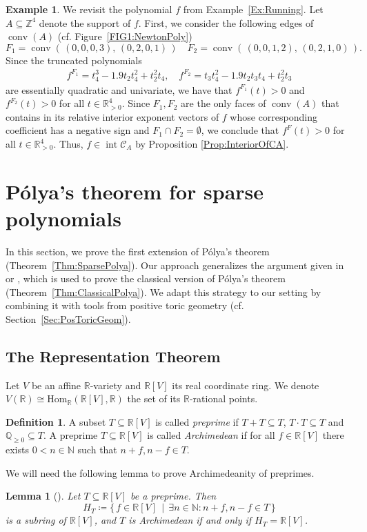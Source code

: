 \documentclass[a4paper,11pt]{amsart}
\newtheorem{lemma}[theorem]{Lemma}
\theoremstyle{definition}
\newtheorem{definition}[theorem]{Definition}
\newtheorem{example}[theorem]{Example}
\DeclareMathOperator{\interior}{int}
\DeclareMathOperator{\conv}{conv}
\newcommand{\NN}{\mathbb{N}}
\newcommand{\QQ}{\mathbb{Q}}
\newcommand{\RR}{\mathbb{R}}
\begin{document}
\begin{example}
\label{Ex:Running:Interior}
    We revisit the polynomial $f$ from Example~\ref{Ex:Running}. Let $A \subseteq \mathbb{Z}^4$ denote the support of $f$. First, we consider the following edges of $\conv(A)$ (cf. Figure~\ref{FIG1:NewtonPoly})
    \[F_1 =\conv(\, (0,0,0,3), \, (0,2,0,1) \,) \quad F_2 =\conv(\, (0,0,1,2), \, (0,2,1,0) \,).  \]
    Since the truncated polynomials 
      \begin{align*}
         f^{F_1} = t_4^3-1.9t_2t_4^2+ t_2^2t_4, \quad f^{F_2} = t_3t_4^2 -1.9t_2t_3t_4 + t_2^2 t_3
    \end{align*}
    are essentially quadratic and univariate, we have that  $f^{F_1}(t) > 0$ and $f^{F_2}(t) > 0$ for all $t \in \mathbb{R}^4_{>0}$. Since $F_1, F_2$ are the only faces of $\conv(A)$ that contains in its relative interior exponent vectors of $f$ whose corresponding coefficient has a negative sign and $F_1 \cap F_2 = \emptyset$, we conclude that $f^{F}(t) > 0$ for all $t \in \mathbb{R}^4_{>0}$.
    Thus, $f \in \interior \mathcal{C}_{A}$ by Proposition \ref{Prop:InteriorOfCA}.
\end{example}



\section{Pólya's theorem for sparse polynomials}
\label{sec:SparsePolya}
In this section, we prove the first extension of Pólya's theorem (Theorem~\ref{Thm:SparsePolya}). Our approach generalizes the argument given in \cite[Theorem 5.5.1]{Marshall} or \cite[Theorem~5.4.1]{Scheiderer2024}, which is used to prove the classical version of Pólya's theorem (Theorem~\ref{Thm:ClassicalPolya}). We adapt this strategy to our setting by combining it with tools from positive toric geometry (cf. Section~\ref{Sec:PosToricGeom}).

\subsection{The Representation Theorem}
\label{Sec:ReprThm}
Let $V$ be an affine $\RR$-variety and $\RR[V]$ its real coordinate ring. We denote $V(\RR) \cong \mathrm{Hom}_\RR(\RR[V], \RR)$ the set of its $\RR$-rational points.

\begin{definition}
    A subset $T \subseteq \RR[V]$ is called \emph{preprime} if $T+T \subseteq T$, $T \cdot T \subseteq T$ and $\QQ_{\ge 0} \subseteq T$.
    A preprime $T \subseteq \RR[V]$ is called \emph{Archimedean} if for all $f \in \RR[V]$ there exists $0< n \in \NN$ such that $n+f, n-f  \in T$.
\end{definition}
We will need the following lemma to prove Archimedeanity of preprimes.
\begin{lemma}[{\cite[Prop.~5.1.3]{Marshall}}]
\label{Lemma:Archimedean}
    Let $T \subseteq \RR[V]$ be a preprime. Then
    \[H_T \coloneqq  \{\,f \in \RR[V] \, \mid \, \exists n \in \mathbb{N} \colon n + f, n - f \in T\,\}\]
    is a subring of $\RR[V]$, and
    $T$ is Archimedean if and only if $H_T = \RR[V]$.
\end{lemma}
\end{document}
